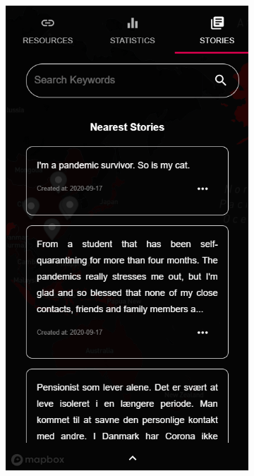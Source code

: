 \documentclass{ucsdreport}
\begin{document}
\begin{figure}[H]
	\begin{subfigure}{.49\textwidth}
	    \centering
		\includegraphics[scale = 0.7]{images/nearest.PNG}
	\end{subfigure}
	\begin{subfigure}{.49\textwidth}
	    \centering

\end{subfigure}
\end{figure}
\end{document}

